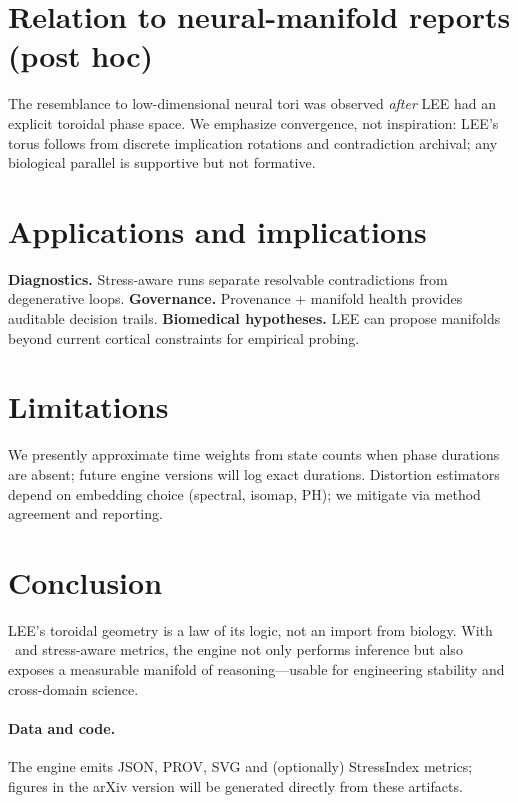 \documentclass[11pt]{article}
\newcommand{\GLMS}{\mathrm{GLMS}}
\begin{document}
\section{Relation to neural-manifold reports (post hoc)}
The resemblance to low-dimensional neural tori \citep{Nature_2011,Nature_2024} was observed \emph{after} LEE had an explicit toroidal phase space.
We emphasize convergence, not inspiration: LEE's torus follows from discrete implication rotations and contradiction archival; any biological parallel is supportive but not formative.

\section{Applications and implications}
\textbf{Diagnostics.} Stress-aware runs separate resolvable contradictions from degenerative loops.\newline
\textbf{Governance.} Provenance + manifold health provides auditable decision trails.\newline
\textbf{Biomedical hypotheses.} LEE can propose manifolds beyond current cortical constraints for empirical probing.

\section{Limitations}
We presently approximate time weights from state counts when phase durations are absent; future engine versions will log exact durations.
Distortion estimators depend on embedding choice (spectral, isomap, PH); we mitigate via method agreement and reporting.

\section{Conclusion}
LEE's toroidal geometry is a law of its logic, not an import from biology. With \GLMS\ and stress-aware metrics, the engine not only performs inference but also exposes a measurable manifold of reasoning—usable for engineering stability and cross-domain science.

\paragraph{Data and code.}
The engine emits JSON, PROV, SVG and (optionally) StressIndex metrics; figures in the arXiv version will be generated directly from these artifacts.



\end{document}
